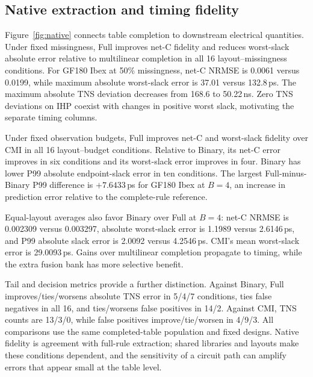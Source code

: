 \documentclass[conference,10pt,letterpaper]{IEEEtran}
\begin{document}
\subsection{Native extraction and timing fidelity}

Figure~\ref{fig:native} connects table completion to downstream electrical quantities. Under fixed missingness, Full improves net-C fidelity and reduces worst-slack absolute error relative to multilinear completion in all 16 layout--missingness conditions. For GF180 Ibex at 50\% missingness, net-C NRMSE is 0.0061 versus 0.0199, while maximum absolute worst-slack error is 37.01 versus 132.8\,ps. The maximum absolute TNS deviation decreases from 168.6 to 50.22\,ns. Zero TNS deviations on IHP coexist with changes in positive worst slack, motivating the separate timing columns.

Under fixed observation budgets, Full improves net-C and worst-slack fidelity over CMI in all 16 layout--budget conditions. Relative to Binary, its net-C error improves in six conditions and its worst-slack error improves in four. Binary has lower P99 absolute endpoint-slack error in ten conditions. The largest Full-minus-Binary P99 difference is $+7.6433$\,ps for GF180 Ibex at $B=4$, an increase in prediction error relative to the complete-rule reference.

Equal-layout averages also favor Binary over Full at $B=4$: net-C NRMSE is 0.002309 versus 0.003297, absolute worst-slack error is 1.1989 versus 2.6146\,ps, and P99 absolute slack error is 2.0092 versus 4.2546\,ps. CMI's mean worst-slack error is 29.0093\,ps. Gains over multilinear completion propagate to timing, while the extra fusion bank has more selective benefit.

Tail and decision metrics provide a further distinction. Against Binary, Full improves/ties/worsens absolute TNS error in 5/4/7 conditions, ties false negatives in all 16, and ties/worsens false positives in 14/2. Against CMI, TNS counts are 13/3/0, while false positives improve/tie/worsen in 4/9/3. All comparisons use the same completed-table population and fixed designs. Native fidelity is agreement with full-rule extraction; shared libraries and layouts make these conditions dependent, and the sensitivity of a circuit path can amplify errors that appear small at the table level.
\end{document}
